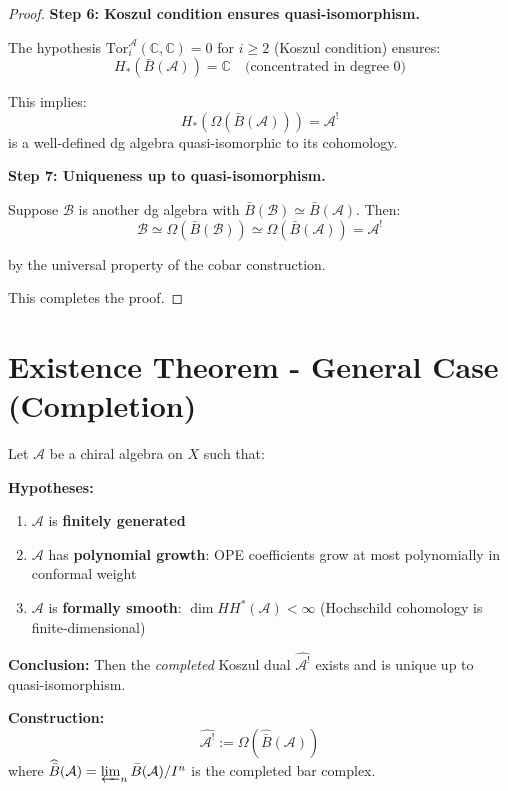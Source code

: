 \begin{proof}
\textbf{Step 6: Koszul condition ensures quasi-isomorphism.}

The hypothesis $\text{Tor}_i^{\mathcal{A}}(\mathbb{C}, \mathbb{C}) = 0$ for $i \geq 2$ (Koszul condition) ensures:
$$H_*(\bar{B}(\mathcal{A})) = \mathbb{C} \quad \text{(concentrated in degree 0)}$$

This implies:
$$H_*(\Omega(\bar{B}(\mathcal{A}))) = \mathcal{A}^!$$
is a well-defined dg algebra quasi-isomorphic to its cohomology.

\textbf{Step 7: Uniqueness up to quasi-isomorphism.}

Suppose $\mathcal{B}$ is another dg algebra with $\bar{B}(\mathcal{B}) \simeq \bar{B}(\mathcal{A})$. Then:
$$\mathcal{B} \simeq \Omega(\bar{B}(\mathcal{B})) \simeq \Omega(\bar{B}(\mathcal{A})) = \mathcal{A}^!$$

by the universal property of the cobar construction.

This completes the proof. \qedhere
\end{proof}

\section{Existence Theorem - General Case (Completion)}

\begin{existencetheorem}
\label{thm:existence-completion}
Let $\mathcal{A}$ be a chiral algebra on $X$ such that:

\textbf{Hypotheses:}
\begin{enumerate}
\item $\mathcal{A}$ is \textbf{finitely generated}
\item $\mathcal{A}$ has \textbf{polynomial growth}: OPE coefficients grow at most polynomially in conformal weight
\item $\mathcal{A}$ is \textbf{formally smooth}: $\dim HH^*(\mathcal{A}) < \infty$ (Hochschild cohomology is finite-dimensional)
\end{enumerate}

\textbf{Conclusion:}
Then the \textit{completed} Koszul dual $\widehat{\mathcal{A}^!}$ exists and is unique up to quasi-isomorphism.

\textbf{Construction:}
$$\widehat{\mathcal{A}^!} := \Omega(\widehat{\bar{B}}(\mathcal{A}))$$
where $\widehat{\bar{B}}(\mathcal{A}) = \varprojlim_n \bar{B}(\mathcal{A})/I^n$ is the completed bar complex.
\end{existencetheorem}


